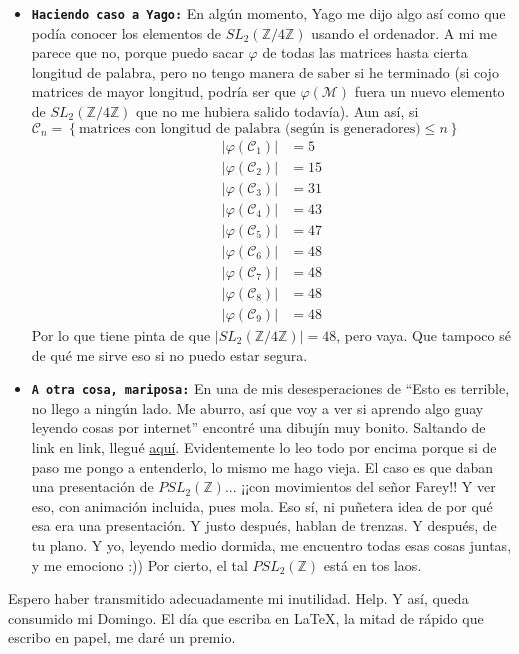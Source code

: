 \documentclass{article}
\newcommand\tab[1][0.6cm]{\hspace*{#1}}
\newcommand\nl{\newline\tab}
\begin{document}
\begin{itemize}
	 	
	 	\item \textbf{\texttt {Haciendo caso a Yago:}} En algún momento, Yago me dijo algo así como que podía conocer los elementos de $SL_2(\mathbb{Z}/4\mathbb{Z})$ usando el ordenador. \nl
	 	 A mi me parece que no, porque puedo sacar $\varphi$ de todas las matrices hasta cierta longitud de palabra, pero no tengo manera de saber si he terminado (si cojo matrices de mayor longitud, podría ser que $\varphi(\mathcal{M})$ fuera un nuevo elemento de $SL_2(\mathbb{Z}/4\mathbb{Z})$ que no me hubiera salido todavía). \nl 
	 	 Aun así, si $\mathcal{C}_n = \left\{ \text{matrices con longitud de palabra (según is generadores)} \leq n\right\}$	 	 
	 	 \begin{align*}
	 	  | \varphi(\mathcal{C}_1) | &= 5 \\	 	 
	 	  | \varphi(\mathcal{C}_2) | &= 15 \\	 	 
	 	  | \varphi(\mathcal{C}_3) | &= 31 \\	 	 
	 	  | \varphi(\mathcal{C}_4) | &= 43 \\	 	 
	 	  | \varphi(\mathcal{C}_5) | &= 47 \\	 	 
	 	  | \varphi(\mathcal{C}_6) | &= 48 \\	 	 
	 	  | \varphi(\mathcal{C}_7) | &= 48 \\	 	 
	 	  | \varphi(\mathcal{C}_8) | &= 48 \\	 	 
	 	  | \varphi(\mathcal{C}_9) | &= 48
	 	\end{align*}
	 	 \tab Por lo que tiene pinta de que $|SL_2(\mathbb{Z}/4\mathbb{Z})| = 48$, pero vaya. Que tampoco sé de qué me sirve eso si no puedo estar segura. 
	 	
	 	 
	 	 \item \textbf{\texttt {A otra cosa, mariposa:}} En una de mis desesperaciones de  ``Esto es terrible, no llego a ningún lado. Me aburro, así que voy a ver si aprendo algo guay leyendo cosas por internet'' encontré una dibujín muy bonito. Saltando de link en link, llegué \href{https://en.wikipedia.org/wiki/Modular_group}{aquí}. Evidentemente lo leo todo por encima porque si de paso me pongo a entenderlo, lo mismo me hago vieja. El caso es que daban una presentación de $PSL_2(\mathbb{Z})$... ¡¡con movimientos del señor Farey!! Y ver eso, con animación incluida, pues mola. Eso sí, ni puñetera idea de por qué esa era una presentación. Y justo después, hablan de trenzas. Y después, de tu plano. Y yo, leyendo medio dormida, me encuentro todas esas cosas juntas, y me emociono :)) \nl Por cierto, el tal $PSL_2(\mathbb{Z})$ está en tos laos. \nl
	\end{itemize}

	Espero haber transmitido adecuadamente mi inutilidad.\nl
	Help.\nl 
	Y así, queda consumido mi Domingo. El día que escriba en \LaTeX,  la mitad de rápido que escribo en papel, me daré un premio. 
	
\end{document}
